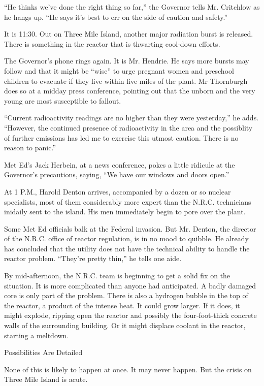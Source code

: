 ``He thinks we've done the right thing so far,'' the Governor tells Mr.
Critchlow as he hangs up. ``He says it's best to err on the side of
caution and safety.''

It is 11:30. Out on Three Mile Island, another major radiation burst is
released. There is something in the reactor that is thwarting cool‐down
efforts.

The Governor's phone rings again. It is Mr. Hendrie. He says more bursts
may follow and that it might be ``wise'' to urge pregnant women and
preschool children to evacuate if they live within five miles of the
plant. Mr Thornburgh does so at a midday press conference, pointing out
that the unborn and the very young are most susceptible to fallout.

``Current radioactivity readings are no higher than they were
yesterday,'' he adds. ``However, the continued presence of radioactivity
in the area and the possiblity of further emissions has led me to
exercise this utmost caution. There is no reason to panic.''

Met Ed's Jack Herbein, at a news conference, pokes a little ridicule at
the Governor's precautions, saying, ``We have our windows and doors
open.''

At 1 P.M., Harold Denton arrives, accompanied by a dozen or so nuclear
specialists, most of them considerably more expert than the N.R.C.
technicians inidaily sent to the island. His men immediately begin to
pore over the plant.

Some Met Ed officials balk at the Federal invasion. But Mr. Denton, the
director of the N.R.C. office of reactor regulation, is in no mood to
quibble. He already has concluded that the utility does not have the
technical ability to handle the reactor problem. ``They're pretty
thin,'' he tells one aide.

By mid‐afternoon, the N.R.C. team is beginning to get a solid fix on the
situation. It is more complicated than anyone had anticipated. A badly
damaged core is only part of the problem. There is also a hydrogen
bubble in the top of the reactor, a product of the intense heat. It
could grow larger. If it does, it might explode, ripping open the
reactor and possibly the four‐foot‐thick concrete walls of the
surrounding building. Or it might displace coolant in the reactor,
starting a meltdown.

Possibilities Are Detailed

None of this is likely to happen at once. It may never happen. But the
crisis on Three Mile Island is acute.

